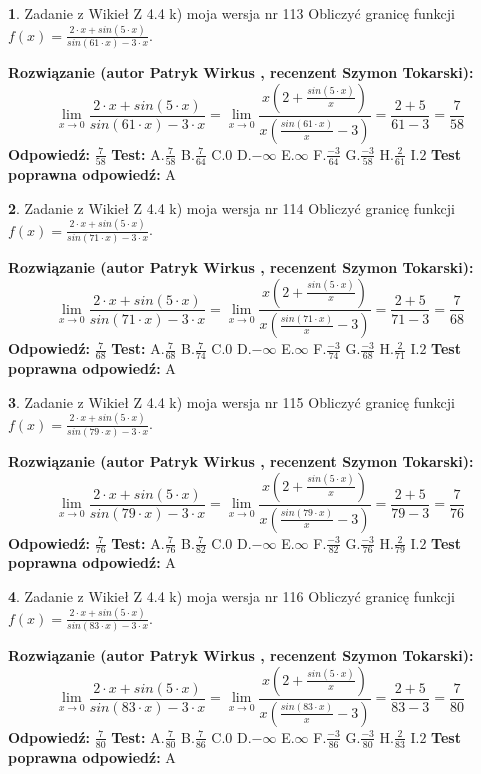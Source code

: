 \documentclass[12pt, a4paper]{article}
\theoremstyle{definition} %
\newtheorem{zad}{}
\newcommand{\zadStart}[1]{\begin{zad}#1\newline}
\newcommand{\zadStop}{\end{zad}}
\newcommand{\rozwStart}[2]{\noindent \textbf{Rozwiązanie (autor #1 , recenzent #2): }\newline}
\newcommand{\rozwStop}{\newline}
\newcommand{\odpStart}{\noindent \textbf{Odpowiedź:}\newline}
\newcommand{\odpStop}{\newline}
\newcommand{\testStart}{\noindent \textbf{Test:}\newline}
\newcommand{\testStop}{\newline}
\newcommand{\kluczStart}{\noindent \textbf{Test poprawna odpowiedź:}\newline}
\newcommand{\kluczStop}{\newline}
\begin{document}
\zadStart{Zadanie z Wikieł Z 4.4 k) moja wersja nr 113}
Obliczyć granicę funkcji $f(x)=\frac{2\cdot x +sin(5\cdot x)}{sin(61\cdot x) -3\cdot x}$.
\zadStop
\rozwStart{Patryk Wirkus}{Szymon Tokarski}
$$\lim\limits_{x\to 0}\frac{2\cdot x +sin(5\cdot x)}{sin(61\cdot x) -3\cdot x}
=\lim\limits_{x\to 0}\frac{x(2+\frac{sin(5\cdot x)}{x})}{x(\frac{sin(61\cdot x)}{x}-3)}
=\frac{2+5}{61-3} = \frac{7}{58}$$
\rozwStop
\odpStart
$\frac{7}{58}$
\odpStop
\testStart
A.$\frac{7}{58}$
B.$\frac{7}{64}$
C.$0$
D.$-\infty$
E.$\infty$
F.$\frac{-3}{64}$
G.$\frac{-3}{58}$
H.$\frac{2}{61}$
I.$2$
\testStop
\kluczStart
A
\kluczStop



\zadStart{Zadanie z Wikieł Z 4.4 k) moja wersja nr 114}
Obliczyć granicę funkcji $f(x)=\frac{2\cdot x +sin(5\cdot x)}{sin(71\cdot x) -3\cdot x}$.
\zadStop
\rozwStart{Patryk Wirkus}{Szymon Tokarski}
$$\lim\limits_{x\to 0}\frac{2\cdot x +sin(5\cdot x)}{sin(71\cdot x) -3\cdot x}
=\lim\limits_{x\to 0}\frac{x(2+\frac{sin(5\cdot x)}{x})}{x(\frac{sin(71\cdot x)}{x}-3)}
=\frac{2+5}{71-3} = \frac{7}{68}$$
\rozwStop
\odpStart
$\frac{7}{68}$
\odpStop
\testStart
A.$\frac{7}{68}$
B.$\frac{7}{74}$
C.$0$
D.$-\infty$
E.$\infty$
F.$\frac{-3}{74}$
G.$\frac{-3}{68}$
H.$\frac{2}{71}$
I.$2$
\testStop
\kluczStart
A
\kluczStop



\zadStart{Zadanie z Wikieł Z 4.4 k) moja wersja nr 115}
Obliczyć granicę funkcji $f(x)=\frac{2\cdot x +sin(5\cdot x)}{sin(79\cdot x) -3\cdot x}$.
\zadStop
\rozwStart{Patryk Wirkus}{Szymon Tokarski}
$$\lim\limits_{x\to 0}\frac{2\cdot x +sin(5\cdot x)}{sin(79\cdot x) -3\cdot x}
=\lim\limits_{x\to 0}\frac{x(2+\frac{sin(5\cdot x)}{x})}{x(\frac{sin(79\cdot x)}{x}-3)}
=\frac{2+5}{79-3} = \frac{7}{76}$$
\rozwStop
\odpStart
$\frac{7}{76}$
\odpStop
\testStart
A.$\frac{7}{76}$
B.$\frac{7}{82}$
C.$0$
D.$-\infty$
E.$\infty$
F.$\frac{-3}{82}$
G.$\frac{-3}{76}$
H.$\frac{2}{79}$
I.$2$
\testStop
\kluczStart
A
\kluczStop



\zadStart{Zadanie z Wikieł Z 4.4 k) moja wersja nr 116}
Obliczyć granicę funkcji $f(x)=\frac{2\cdot x +sin(5\cdot x)}{sin(83\cdot x) -3\cdot x}$.
\zadStop
\rozwStart{Patryk Wirkus}{Szymon Tokarski}
$$\lim\limits_{x\to 0}\frac{2\cdot x +sin(5\cdot x)}{sin(83\cdot x) -3\cdot x}
=\lim\limits_{x\to 0}\frac{x(2+\frac{sin(5\cdot x)}{x})}{x(\frac{sin(83\cdot x)}{x}-3)}
=\frac{2+5}{83-3} = \frac{7}{80}$$
\rozwStop
\odpStart
$\frac{7}{80}$
\odpStop
\testStart
A.$\frac{7}{80}$
B.$\frac{7}{86}$
C.$0$
D.$-\infty$
E.$\infty$
F.$\frac{-3}{86}$
G.$\frac{-3}{80}$
H.$\frac{2}{83}$
I.$2$
\testStop
\kluczStart
A
\kluczStop
\end{document}
